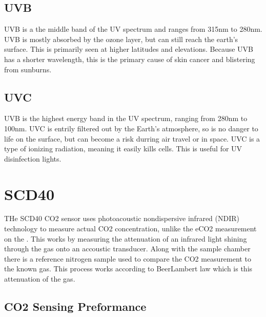 \documentclass[letterpaper,10pt,english]{sphinxmanual}
\begin{document}
\subsection{UVB}
\label{\detokenize{sensors/ltr390:uvb}}
\sphinxAtStartPar
UVB is a the middle band of the UV spectrum and ranges from 315nm to 280nm. UVB is mostly absorbed by the ozone layer, but can still reach the earth’s surface. This is primarily seen at higher latitudes and elevations. Because UVB has a shorter wavelength, this is the primary cause of skin cancer and blistering from sunburns.


\subsection{UVC}
\label{\detokenize{sensors/ltr390:uvc}}
\sphinxAtStartPar
UVB is the highest energy band in the UV spectrum, ranging from 280nm to 100nm. UVC is entrily filtered out by the Earth’s atmosphere, so is no danger to life on the surface, but can become a risk durring air travel or in space. UVC is a type of ionizing radiation, meaning it easily kills cells. This is useful for UV disinfection lights.

\sphinxstepscope


\section{SCD40}
\label{\detokenize{sensors/scd40:scd40}}\label{\detokenize{sensors/scd40:id1}}\label{\detokenize{sensors/scd40::doc}}

\sphinxAtStartPar
THe SCD40 CO2 sensor uses photoacoustic nondispersive infrared (NDIR) technology to measure actual CO2 concentration, unlike the eCO2 measurement on the {\hyperref[\detokenize{sensors/ens160:ens160}]{}}. This works by measuring the attenuation of an infrared light shining through the gas onto an accoustic transducer. Along with the sample chamber there is a reference nitrogen sample used to compare the CO2 measurement to the known gas. This process works according to Beer\sphinxhyphen{}Lambert law which is this attenuation of the gas.



\subsection{CO2 Sensing Preformance}
\label{\detokenize{sensors/scd40:co2-sensing-preformance}}
\end{document}
